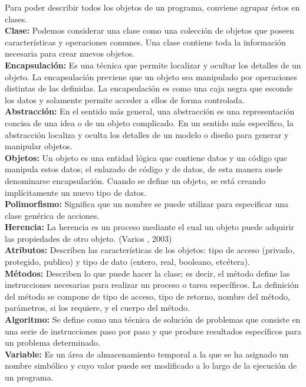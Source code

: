 Para poder describir todos los objetos de un programa, conviene agrupar éstos en clases. 
\\
\textbf{Clase:} Podemos considerar una clase como una colección de objetos que poseen características y operaciones comunes. Una clase contiene toda la información necesaria para crear nuevos objetos. 
\\
\textbf{Encapsulación:} Es una técnica que permite localizar y ocultar los detalles de un objeto. La encapsulación previene que un objeto sea manipulado por operaciones distintas de las definidas. La encapsulación es como una caja negra que esconde los datos y solamente permite acceder a ellos de forma controlada.
\\
\textbf{Abstracción:} En el sentido más general, una abstracción es una representación concisa de una idea o de un objeto complicado. En un sentido más específico, la abstracción localiza y oculta los detalles de un modelo o diseño para generar y manipular objetos.
\\
\textbf{Objetos:} Un objeto es una entidad lógica que contiene datos y un código que manipula estos datos; el enlazado de código y de datos, de esta manera suele denominarse encapsulación. 
Cuando se define un objeto, se está creando implícitamente un nuevo tipo de datos. 
\\
\textbf{Polimorfismo:} Significa que un nombre se puede utilizar para especificar una clase genérica de acciones. 
\\
\textbf{Herencia:} La herencia es un proceso mediante el cual un objeto puede adquirir las propiedades de otro objeto. (Varios , 2003)
\\
\textbf{Atributos:} Describen las características de los objetos: tipo de acceso (privado, protegido, publico) y tipo de dato (entero, real, booleano, etcétera).
\\
\textbf{Métodos:} Describen lo que puede hacer la clase; es decir, el método define las instrucciones necesarias para realizar un proceso o tarea específicos. La definición del método se compone de tipo de acceso, tipo de retorno, nombre del método, parámetros, si los requiere, y el cuerpo del método.
\\
\textbf{Algoritmo:} Se define como una técnica de solución de problemas que consiste en una serie de instrucciones paso por paso y que produce resultados específicos para un problema determinado.
\\
\textbf{Variable:} Es un área de almacenamiento temporal a la que se ha asignado un nombre simbólico y cuyo valor puede ser modificado a lo largo de la ejecución de un programa.
